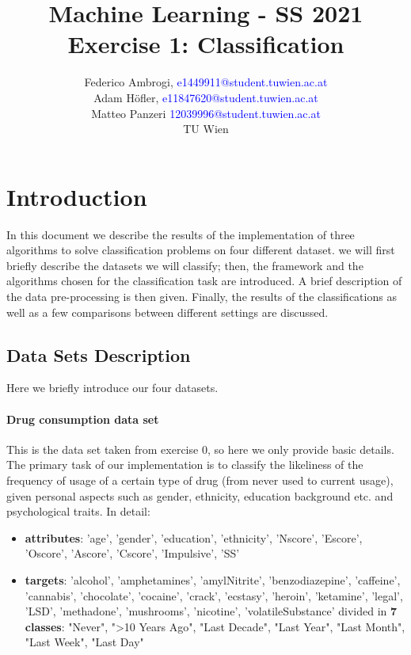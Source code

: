 \documentclass{article}
\begin{document}
\title{ Machine Learning - SS 2021 \\ Exercise 1: Classification }


	\author{Federico Ambrogi, \textcolor{blue} {e1449911@student.tuwien.ac.at } \\
	Adam Höfler, \textcolor{blue} {e11847620@student.tuwien.ac.at } \\
	Matteo Panzeri \textcolor{blue}{12039996@student.tuwien.ac.at } \\
    TU Wien }






\maketitle
\setcounter{tocdepth}{2}
\tableofcontents

\section{Introduction}
In this document we describe the results of the implementation of three algorithms to solve classification problems on four different dataset. we will first briefly describe the datasets we will classify; then, the framework and the algorithms chosen for the classification task are introduced. A brief description of the data pre-processing is then given. Finally, the results of the classifications as well as a few comparisons between different settings are discussed.




\subsection{Data Sets Description}
Here we briefly introduce our four datasets.

\paragraph{Drug consumption data set} This is the data set\cite{DrugConsumption}\cite{fehrman2017factor} taken from exercise 0, so here we only provide basic details. The primary task of our implementation is to classify the likeliness of the frequency of usage of a certain type of drug (from never used to current usage), given personal aspects such as gender, ethnicity, education background etc. and psychological traits.
In detail:
\begin{itemize}
	\item  \textbf{attributes}: 'age', 'gender', 'education', 'ethnicity', 'Nscore', 'Escore', 'Oscore', 'Ascore', 'Cscore', 'Impulsive', 'SS' \\
	\item  \textbf{targets}: 'alcohol', 'amphetamines', 'amylNitrite', 'benzodiazepine', 'caffeine', 'cannabis', 'chocolate', 'cocaine', 'crack', 'ecstasy', 'heroin', 'ketamine', 'legal', 'LSD',
	'methadone', 'mushrooms', 'nicotine', 'volatileSubstance'
	divided in \textbf{7 classes}: "Never", ">10 Years Ago", "Last Decade", "Last Year", "Last Month", "Last Week", "Last Day"
\end{itemize}
\end{document}
